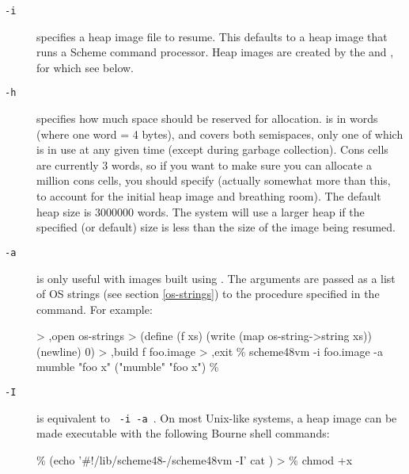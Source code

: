 \begin{description}
\item[{\tt -i} ]
    specifies a heap image file to resume.  This defaults to a heap
    image that runs a Scheme command processor.  Heap images are
    created by the  and , for which see below.

\item[{\tt -h} ]
    specifies how much space should be reserved for allocation.
     is in words (where one word = 4 bytes), and covers both
    semispaces, only one of which is in use at any given time (except
    during garbage collection).  Cons cells are currently 3 words, so
    if you want to make sure you can allocate a million cons cells,
    you should specify  (actually somewhat more than this,
    to account for the initial heap image and breathing room).
    The default heap size is 3000000 words.  The system will use a
    larger heap if the specified (or default) size is less than
    the size of the image being resumed.


\item[{\tt -a} ]
    is only useful with images built using .
    The arguments are passed as a list of OS strings (see section
    \ref{os-strings}) to the procedure specified
    in the  command. For example:
\begin{example}
> ,open os-strings
> (define (f xs) (write (map os-string->string xs)) (newline) 0)
> ,build f foo.image
> ,exit
\% scheme48vm -i foo.image -a mumble "foo x"
("mumble" "foo x")
\%
\end{example}

\item[{\tt -I}  ]
    is equivalent to {\tt %
      -i  -a }.
    On most Unix-like systems, a heap image can be made executable with the
    following Bourne shell commands:
\begin{example}
\% (echo '\#!/lib/scheme48-/scheme48vm -I'
   cat ) >
\% chmod +x 
\end{example}
\end{description}

